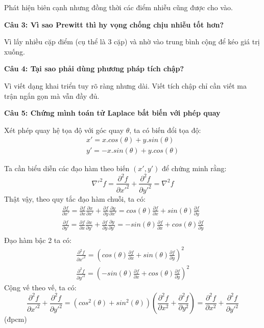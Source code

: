 Phát hiện biên cạnh nhưng đồng thời các điểm nhiễu cũng được cho vào.

\textbf{Câu 3: Vì sao Prewitt thì hy vọng chống chịu nhiễu tốt hơn?}

Vì lấy nhiều cặp điểm (cụ thể là 3 cặp) và nhờ vào trung bình cộng để kéo giá trị xuống.

\textbf{Câu 4: Tại sao phải dùng phương pháp tích chập?}

Vì viết dạng khai triển tuy rõ ràng nhưng dài. Viết tích chập chỉ cần viết ma trận ngắn gọn mà vẫn đầy đủ.

\textbf{Câu 5: Chứng mình toán tử Laplace bất biến với phép quay}

Xét phép quay hệ tọa độ với góc quay $\theta$, ta có biến đổi tọa độ:
\begin{align*}
	x' = x.cos(\theta) + y.sin(\theta) \\
	y' = -x.sin(\theta) + y.cos(\theta)
\end{align*}

Ta cần biểu diễn các đạo hàm theo biến $(x',y')$ để chứng minh rằng:
\[\nabla'^2f = \frac{\partial ^2f}{\partial x'^2} + \frac{\partial ^2f}{\partial y'^2} = \nabla^2f\]
Thật vậy, theo quy tắc đạo hàm chuỗi, ta có:
\begin{align*}
	\frac{\partial f}{\partial x'} = \frac{\partial f}{\partial x} \frac{\partial x}{\partial x'} + \frac{\partial f}{\partial y} \frac{\partial y}{\partial x'} = cos(\theta) \frac{\partial f}{\partial x} + sin(\theta) \frac{\partial f}{\partial y}  \\
	\frac{\partial f}{\partial y'} = \frac{\partial f}{\partial x} \frac{\partial x}{\partial y'} + \frac{\partial f}{\partial y} \frac{\partial y}{\partial y'} = -sin(\theta)\frac{\partial f}{\partial x} + cos(\theta) \frac{\partial f}{\partial y} \\
\end{align*}
Đạo hàm bậc 2 ta có:
\begin{align*}
	\frac{\partial ^2 f}{\partial x'^2} = \left(cos(\theta) \frac{\partial f}{\partial x} + sin(\theta) \frac{\partial f}{\partial y}\right)^2 \\
	\frac{\partial ^2 f}{\partial y'^2} = \left(-sin(\theta)\frac{\partial f}{\partial x} + cos(\theta) \frac{\partial f}{\partial y}\right)^2
\end{align*}
Cộng vế theo vế, ta có:
\[\frac{\partial ^2 f}{\partial x'^2} + \frac{\partial ^2 f}{\partial y'^2} = (cos^2(\theta) + sin^2(\theta)) (\frac{\partial ^2 f}{\partial x^2} + \frac{\partial ^2 f}{\partial y^2}) = \frac{\partial ^2 f}{\partial x^2} + \frac{\partial ^2 f}{\partial y'^2}\] (đpcm)

